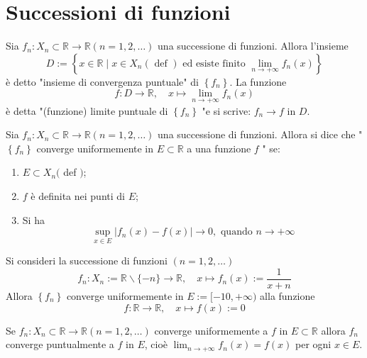 
\section{Successioni di funzioni}
\begin{boxdef}
    Sia $f_{n}: X_{n} \subset \mathbb{R} \rightarrow \mathbb{R}(n=1,2, \ldots)$ una successione di funzioni. Allora l'insieme
    \[D:=\left\{x \in \mathbb{R} \mid x \in X_{n}(\text { def }) \text { ed esiste finito } \lim _{n \rightarrow+\infty} f_{n}(x)\right\}\]
    è detto "insieme di convergenza puntuale" di $\left\{f_{n}\right\}$. La funzione
    \[f: D \rightarrow \mathbb{R}, \quad x \mapsto \lim _{n \rightarrow+\infty} f_{n}(x)\]
    è detta "(funzione) limite puntuale di $\left\{f_{n}\right\}$ "e si scrive: $f_{n} \rightarrow f$ in $D$.
\end{boxdef}

\begin{boxdef}
    Sia $f_{n}: X_{n} \subset \mathbb{R} \rightarrow \mathbb{R}(n=1,2, \ldots)$ una successione di funzioni. Allora si dice che " $\left\{f_{n}\right\}$ converge uniformemente in $E \subset \mathbb{R}$ a una funzione $f$ " se:
    \begin{enumerate}[i]
        \item $E \subset X_{n}($ def $)$;
        \item $f$ è definita nei punti di $E$;
        \item Si ha
        \[\sup _{x \in E}\left|f_{n}(x)-f(x)\right| \rightarrow 0, \text { quando } n \rightarrow+\infty\]
    \end{enumerate}
\end{boxdef}
\begin{ex}
    Si consideri la successione di funzioni $(n=1,2, \ldots)$
    \[f_{n}: X_{n}:=\mathbb{R} \backslash\{-n\} \rightarrow \mathbb{R}, \quad x \mapsto f_{n}(x):=\frac{1}{x+n}\]
    Allora $\left\{f_{n}\right\}$ converge uniformemente in $E:=[-10,+\infty)$ alla funzione
    \[f: \mathbb{R} \rightarrow \mathbb{R}, \quad x \mapsto f(x):=0\]
\end{ex}
\begin{oss}
    Se $f_{n}: X_{n} \subset \mathbb{R} \rightarrow \mathbb{R}(n=1,2, \ldots)$ converge uniformemente a $f$ in $E \subset \mathbb{R}$ allora $f_{n}$ converge puntualmente a $f$ in $E$, cioè $\lim _{n \rightarrow+\infty} f_{n}(x)=f(x)$ per ogni $x \in E$.
\end{oss}

